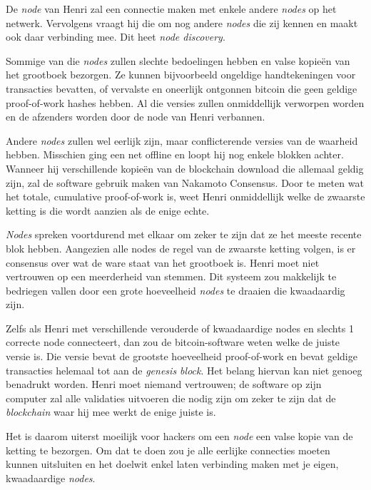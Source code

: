 De \textit{node} van Henri zal een connectie maken met enkele andere \textit{nodes} op het netwerk. Vervolgens vraagt hij die om nog andere \textit{nodes} die zij kennen en maakt ook daar verbinding mee. Dit heet \textit{node discovery}.

Sommige van die \textit{nodes} zullen slechte bedoelingen hebben en valse kopieën van het grootboek bezorgen. Ze kunnen bijvoorbeeld ongeldige handtekeningen voor transacties bevatten, of vervalste en oneerlijk ontgonnen bitcoin die geen geldige proof-of-work hashes hebben. Al die versies zullen onmiddellijk verworpen worden en de afzenders worden door de node van Henri verbannen.

Andere \textit{nodes} zullen wel eerlijk zijn, maar conflicterende versies van de waarheid hebben. Misschien ging een net offline en loopt hij nog enkele blokken achter. Wanneer hij verschillende kopieën van de blockchain download die allemaal geldig zijn, zal de software gebruik maken van Nakamoto Consensus. Door te meten wat het totale, cumulative proof-of-work is, weet Henri onmiddellijk welke de zwaarste ketting is die wordt aanzien als de enige echte.

\textit{Nodes} spreken voortdurend met elkaar om zeker te zijn dat ze het meeste recente blok hebben. Aangezien alle nodes de regel van de zwaarste ketting volgen, is er consensus over wat de ware staat van het grootboek is. Henri moet niet vertrouwen op een meerderheid van stemmen. Dit systeem zou makkelijk te bedriegen vallen door een grote hoeveelheid \textit{nodes} te draaien die kwaadaardig zijn.

Zelfs als Henri met verschillende verouderde of kwaadaardige nodes en slechts 1 correcte node connecteert, dan zou de bitcoin-software weten welke de juiste versie is. Die versie bevat de grootste hoeveelheid proof-of-work en bevat geldige transacties helemaal tot aan de \textit{genesis block}. Het belang hiervan kan niet genoeg benadrukt worden. Henri moet niemand vertrouwen; de software op zijn computer zal alle validaties uitvoeren die nodig zijn om zeker te zijn dat de \textit{blockchain} waar hij mee werkt de enige juiste is.

Het is daarom uiterst moeilijk voor hackers om een \textit{node} een valse kopie van de ketting te bezorgen. Om dat te doen zou je alle eerlijke connecties moeten kunnen uitsluiten en het doelwit enkel laten verbinding maken met je eigen, kwaadaardige \textit{nodes}.

